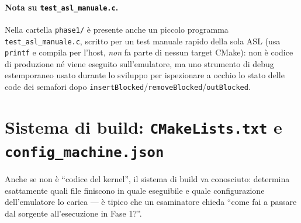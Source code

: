 \documentclass[11pt,a4paper]{article}
\newcommand{\code}[1]{\texttt{#1}}
\begin{document}
\paragraph{Nota su \code{test\_asl\_manuale.c}.} Nella cartella
\code{phase1/} è presente anche un piccolo programma
\code{test\_asl\_manuale.c}, scritto per un test manuale rapido della sola
ASL (usa \code{printf} e compila per l'host, \emph{non} fa parte di nessun
target CMake): non è codice di produzione né viene eseguito
sull'emulatore, ma uno strumento di debug estemporaneo usato durante lo
sviluppo per ispezionare a occhio lo stato delle code dei semafori dopo
\code{insertBlocked}/\code{removeBlocked}/\code{outBlocked}.

\section{Sistema di build: \code{CMakeLists.txt} e \code{config\_machine.json}}

Anche se non è ``codice del kernel'', il sistema di build va conosciuto:
determina esattamente quali file finiscono in quale eseguibile e quale
configurazione dell'emulatore lo carica --- è tipico che un esaminatore
chieda ``come fai a passare dal sorgente all'esecuzione in Fase 1?''.
\end{document}
